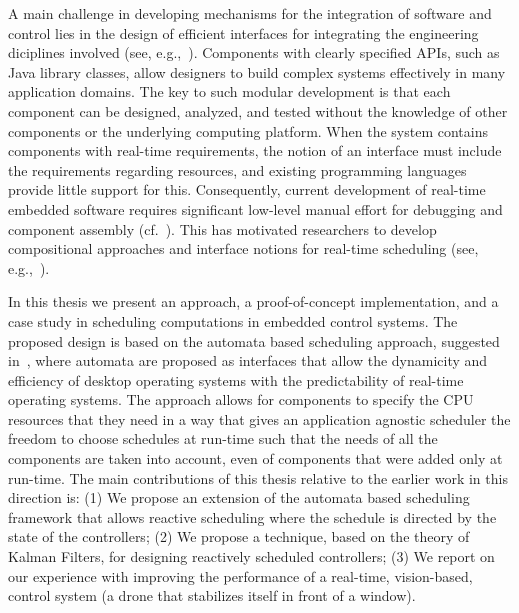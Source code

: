 \documentclass[ twoside, 12pt ]{article}
\begin{document}
A main challenge in developing mechanisms for the integration of software and control lies in the design of efficient interfaces for integrating the engineering diciplines involved (see, e.g.,~\cite{weiss2007automata}). Components with clearly specified APIs, such as Java library classes, allow designers to build complex systems effectively in many application domains.  The key to such modular development is that each component can be designed, analyzed, and tested without the knowledge of other components or the underlying computing platform. When the system contains components with real-time requirements, the notion of an interface must include the requirements regarding resources, and existing programming languages provide little support for this.  Consequently, current development of real-time embedded software requires significant low-level manual effort for debugging and component assembly (cf.~\cite{Lee00,IEEE03,HS06}). This has motivated researchers to develop compositional approaches and interface notions for real-time scheduling (see, e.g.,~\cite{RS01,dH01,MF01,CAHS03,SL08,SLBS04,TWS06,DBLP:conf/lctrts/AuerbachBIKRRT07}).

In this thesis we present an approach, a proof-of-concept implementation, and a case study in scheduling computations in embedded control systems. The proposed design is based on the automata based scheduling approach, suggested in~\cite{weiss2007automata,RTComposer,AW08,ESNAASHARI20102410,liu2013synthesis}, where automata are proposed as interfaces that allow the dynamicity and efficiency of desktop operating systems with the predictability of real-time operating systems. The approach allows for components to specify the CPU resources that they need in a way that gives an application agnostic scheduler the freedom to choose schedules at run-time such that the needs of all the components are taken into account, even of components that were added only at run-time. The main contributions of this thesis relative to the earlier work in this direction is: (1) We propose an extension of the automata based scheduling framework that allows reactive scheduling where the schedule is directed by the state of the controllers; (2) We propose a technique, based on the theory of Kalman Filters, for designing reactively scheduled controllers; (3) We report on our experience with improving the performance of a real-time, vision-based, control system (a drone that stabilizes itself in front of a window).
\end{document}
